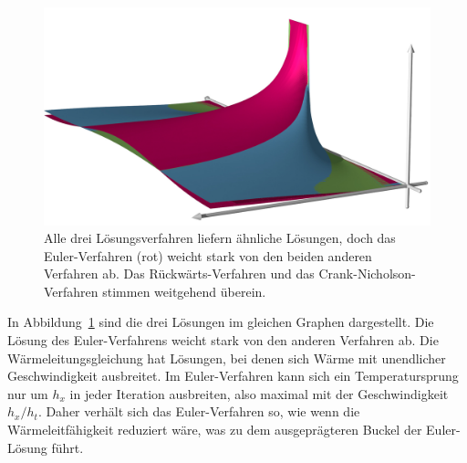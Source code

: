 \begin{figure}
\centering
\includegraphics[width=\hsize]{chapters/70-pde/images/combined.jpg}
\caption{Alle drei Lösungsverfahren liefern ähnliche Lösungen,
doch das Euler-Verfahren (rot) weicht stark von den beiden anderen
Verfahren ab.
Das Rückwärts-Verfahren und das Crank-Nicholson-Verfahren stimmen
weitgehend überein.
\label{buch:pde:waerme:figure:combined}}
\end{figure}
In Abbildung~\ref{buch:pde:waerme:figure:combined} sind die drei
Lösungen im gleichen Graphen dargestellt. 
Die Lösung des Euler-Verfahrens weicht stark von den anderen Verfahren ab.
Die Wärmeleitungsgleichung hat Lösungen, bei denen sich Wärme mit
unendlicher Geschwindigkeit ausbreitet.
Im Euler-Verfahren kann sich ein Temperatursprung nur um $h_x$ in
jeder Iteration ausbreiten, also maximal mit der Geschwindigkeit $h_x/h_t$.
Daher verhält sich das Euler-Verfahren so, wie wenn die Wärmeleitfähigkeit
reduziert wäre, was zu dem ausgeprägteren Buckel der Euler-Lösung
führt.


